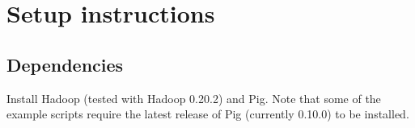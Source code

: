 \documentclass[a4paper,10pt,bibtotoc,abstracton,oneside,noindent,DIV15]{scrartcl}
\newcommand{\Css}[1]{}
\begin{document}

\lstset{breaklines=true}

\Css{div.lstlisting{font-family: monospace;
    white-space: nowrap; margin-top:0.5em;
    margin-bottom:0.5em;
    color: blue;}}

\Css{ol li { padding: 0; margin: 0.5em; }}



\section{Setup instructions}

\subsection{Dependencies}
Install Hadoop (tested with Hadoop 0.20.2) and Pig. Note that some of the
example scripts require the latest release of Pig (currently 0.10.0) to
be installed.
\end{document}
